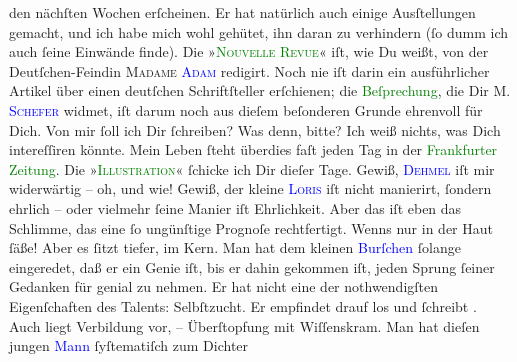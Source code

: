                den nächſten Wochen erſcheinen. Er hat natürlich auch einige Ausſtellungen gemacht,
               und ich habe mich wohl gehütet,  ihn daran zu
               verhindern (ſo dumm ich auch ſeine Einwände finde). Die »\textsc{\textcolor{green}{Nouvelle Revue}{}\ledrightnote{\textcolor{green}{La Nouvelle Revue}}}« iſt, wie Du {\pb}weißt, von der Deutſchen-Feindin
               \textsc{Madame \textcolor{blue}{Adam}{}\ledrightnote{\textcolor{blue}{Juliette Adam}}} redigirt. Noch nie iſt darin ein ausführlicher Artikel über einen deutſchen
               Schriftſteller erſchienen; die \textcolor{green}{Beſprechung}{}, die Dir \textsc{M. \textcolor{blue}{Schefer}{}\ledrightnote{\textcolor{blue}{Christian Schefer}}} widmet, iſt darum noch aus dieſem beſonderen Grunde ehrenvoll für Dich.\pend
           \pstart
           Von mir ſoll ich Dir ſchreiben? Was denn, bitte? Ich weiß {\pb}nichts, was Dich intereſſiren könnte. Mein Leben
               ſteht überdies faſt jeden Tag in der \textcolor{green}{Frankfurter
                  Zeitung}{}\ledrightnote{\textcolor{green}{Frankfurter Zeitung}}.\pend
           \pstart
           Die »\textsc{\textcolor{green}{Illustration}{}\ledrightnote{\textcolor{green}{L’Illustration}}}« ſchicke ich Dir dieſer Tage.\pend
           \pstart
           Gewiß, \textsc{\textcolor{blue}{Dehmel}{}\ledrightnote{\textcolor{blue}{Richard Dehmel}}} iſt mir widerwärtig – oh, und wie!\pend
           \pstart
           Gewiß, der kleine \textsc{\textcolor{blue}{Loris}{}\ledrightnote{\textcolor{blue}{Hugo von Hofmannsthal}}} iſt nicht manierirt, {\pb}ſondern ehrlich – oder
               vielmehr ſeine Manier iſt Ehrlichkeit. Aber das iſt eben das Schlimme, das eine ſo
               ungünſtige  Prognoſe rechtfertigt. \strikeout{\textcolor{gray}{W}} Wenns nur in der Haut ſäße! Aber es ſitzt tiefer, im Kern. Man hat dem kleinen
                  \textcolor{blue}{Burſchen}{} ſolange
               eingeredet, daß er ein Genie iſt, bis er dahin gekommen iſt, jeden Sprung ſeiner
               Gedanken für genial zu nehmen. {\pb}Er hat nicht eine
               der nothwendigſten Eigenſchaften des Talents: Selbſtzucht. Er empfindet drauf
               los und ſchreibt \label{K_L02776-15v}\label{K_L02776-15h}. Auch liegt
               Verbildung vor, – Überſtopfung mit Wiſſenskram. Man hat dieſen jungen \textcolor{blue}{Mann}{} ſyſtematiſch zum Dichter
